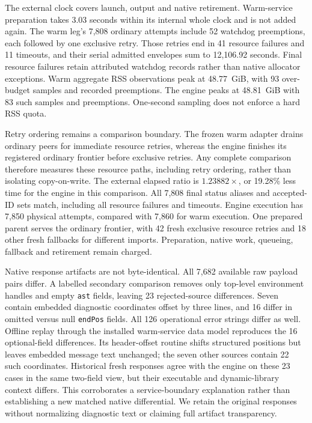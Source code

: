 \documentclass[10pt,twocolumn]{article}
\begin{document}
The external clock covers launch, output and native retirement. Warm-service
preparation takes 3.03 seconds within its internal whole clock and is not
added again. The warm leg's 7,808 ordinary attempts include 52 watchdog
preemptions, each followed by
one exclusive retry. Those retries end in 41 resource failures and 11 timeouts,
and their serial admitted envelopes sum to 12,106.92 seconds.
Final resource failures retain attributed watchdog records rather than native
allocator exceptions. Warm aggregate RSS observations peak at
48.77~GiB, with 93 over-budget samples and recorded preemptions. The engine
peaks at 48.81~GiB with 83 such samples and preemptions.
One-second sampling does not enforce a hard RSS quota.

Retry ordering remains a comparison boundary. The frozen warm adapter drains
ordinary peers for immediate resource retries, whereas the engine finishes its
registered ordinary frontier before exclusive retries. Any complete comparison
therefore measures these resource paths, including retry ordering, rather than
isolating copy-on-write.
The external elapsed ratio is $1.23882\times$, or 19.28\% less time for the
engine in this comparison. All 7,808 final status aliases and accepted-ID sets match,
including all resource failures and timeouts. Engine execution has 7,850
physical attempts, compared with 7,860 for warm execution. One prepared parent
serves the ordinary frontier, with 42 fresh exclusive resource retries and
18 other fresh fallbacks for different imports. Preparation, native work,
queueing, fallback and retirement remain charged.

Native response artifacts are not byte-identical. All 7,682 available raw
payload pairs differ. A labelled secondary comparison removes only top-level
environment handles and empty \texttt{ast} fields, leaving 23 rejected-source
differences. Seven contain embedded diagnostic coordinates offset by three
lines, and 16 differ in omitted versus null \texttt{endPos} fields. All 126
operational error strings differ as well. Offline replay through the installed
warm-service data model reproduces the 16 optional-field differences.
Its header-offset routine shifts structured positions but leaves embedded
message text unchanged; the seven other sources contain 22 such coordinates.
Historical fresh responses agree with the engine on these 23 cases in the same
two-field view, but their executable and dynamic-library context differs.
This corroborates a service-boundary explanation rather than establishing a
new matched native differential. We retain the original responses without
normalizing diagnostic text or claiming full artifact transparency.
\end{document}
